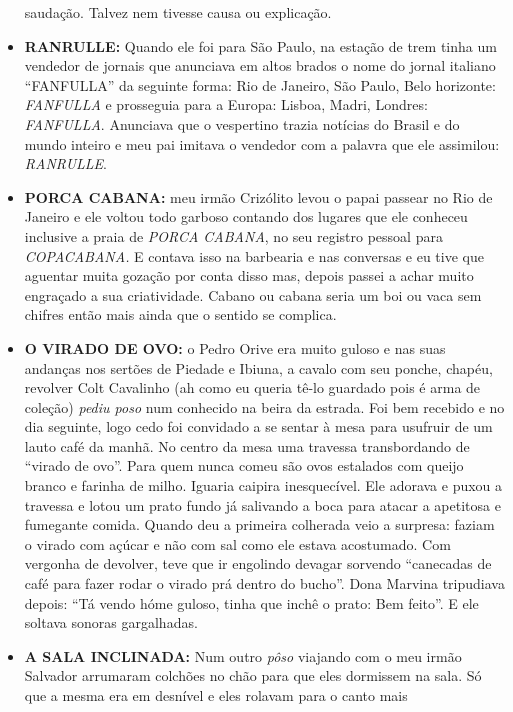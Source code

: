 \documentclass[12pt,brazil,]{book}
\begin{document}
\begin{itemize}
  saudação. Talvez nem tivesse causa ou explicação.\\
\item
  \textbf{RANRULLE:} Quando ele foi para São Paulo, na estação de trem
  tinha um vendedor de jornais que anunciava em altos brados o nome do
  jornal italiano ``FANFULLA'' da seguinte forma: Rio de Janeiro, São
  Paulo, Belo horizonte: \emph{FANFULLA} e prosseguia para a Europa:
  Lisboa, Madri, Londres: \emph{FANFULLA}. Anunciava que o vespertino
  trazia notícias do Brasil e do mundo inteiro e meu pai imitava o
  vendedor com a palavra que ele assimilou: \emph{RANRULLE}.\\
\item
  \textbf{PORCA CABANA:} meu irmão Crizólito levou o papai passear no
  Rio de Janeiro e ele voltou todo garboso contando dos lugares que ele
  conheceu inclusive a praia de \emph{PORCA CABANA}, no seu registro
  pessoal para \emph{COPACABANA.} E contava isso na barbearia e nas
  conversas e eu tive que aguentar muita gozação por conta disso mas,
  depois passei a achar muito engraçado a sua criatividade. Cabano ou
  cabana seria um boi ou vaca sem chifres então mais ainda que o sentido
  se complica.
\item
  \textbf{O VIRADO DE OVO:} o Pedro Orive era muito guloso e nas suas
  andanças nos sertões de Piedade e Ibiuna, a cavalo com seu ponche,
  chapéu, revolver Colt Cavalinho (ah como eu queria tê-lo guardado pois
  é arma de coleção) \emph{pediu poso} num conhecido na beira da
  estrada. Foi bem recebido e no dia seguinte, logo cedo foi convidado a
  se sentar à mesa para usufruir de um lauto café da manhã. No centro da
  mesa uma travessa transbordando de ``virado de ovo''. Para quem nunca
  comeu são ovos estalados com queijo branco e farinha de milho. Iguaria
  caipira inesquecível. Ele adorava e puxou a travessa e lotou um prato
  fundo já salivando a boca para atacar a apetitosa e fumegante comida.
  Quando deu a primeira colherada veio a surpresa: faziam o virado com
  açúcar e não com sal como ele estava acostumado. Com vergonha de
  devolver, teve que ir engolindo devagar sorvendo ``canecadas de café
  para fazer rodar o virado prá dentro do bucho''. Dona Marvina
  tripudiava depois: ``Tá vendo hóme guloso, tinha que inchê o prato:
  Bem feito''. E ele soltava sonoras gargalhadas.\\
\item
  \textbf{A SALA INCLINADA:} Num outro \emph{pôso} viajando com o meu
  irmão Salvador arrumaram colchões no chão para que eles dormissem na
  sala. Só que a mesma era em desnível e eles rolavam para o canto mais

\end{itemize}
\end{document}
